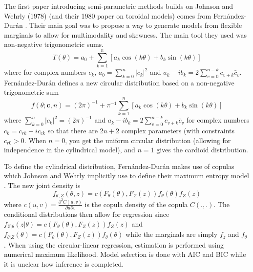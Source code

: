 The first paper introducing semi-parametric methods builds on Johnson and Wehrly (1978) (and their 1980 paper on toroidal models) comes from Fern\'{a}ndez-Dur\'{a}n \cite{fernandez-duran_models_2007}. Their main goal was to propose a way to generate models from flexible marginals to allow for multimodality and skewness. The main tool they used was non-negative trigonometric sums. \[T(\theta) = a_0 + \sum_{k=1}^n \left[a_k \cos(k\theta) + b_k \sin(k\theta)\right]\] where for complex numbers $c_k$, $a_0 = \sum_{k=0}^n|c_k|^2$ and $a_k - i b_k = 2\sum_{v=0}^{n-k}c_{v+k} \bar{c}_v$. Fern\'{a}ndez-Dur\'{a}n defines a new circular distribution based on a non-negative trigonometric sum \[f(\theta; \mathbf{c}, n) = (2\pi)^{-1} + \pi^{-1} \sum_{k=1}^n \left[a_k \cos(k\theta) + b_k \sin(k\theta)\right]\] where $\sum_{k=0}^n|c_k|^2 = (2\pi)^{-1}$ and $a_k - i b_k = 2\sum_{v=0}^{n-k}c_{v+k} \bar{c}_v$ for complex numbers $c_k = c_{rk} + i c_{ck}$ so that there are $2n+2$ complex parameters (with constraints $c_{r0} > 0$. When $n=0$, you get the uniform circular distribution (allowing for independence in the cylindrical model), and $n=1$ gives the cardioid distribution. 

To define the cylindrical distribution, Fern\'{a}ndez-Dur\'{a}n makes use of copulas which Johnson and Wehrly implicitly use to define their maximum entropy model \cite{fernandez-duran_models_2007}\cite{johnson_angular-linear_1978}. The new joint density is \[f_{\theta, Z}(\theta, z) = c(F_\theta(\theta), F_Z(z))f_\theta(\theta)f_Z(z)\] where $c(u,v) = \frac{\partial^2 C(u,v)}{\partial u \partial v}$ is the copula density of the copula $C(.,.)$. The conditional distributions then allow for regression since $f_{Z|\theta}(z|\theta) = c(F_\theta(\theta), F_Z(z))f_Z(z)$ and $f_{\theta|Z}(\theta) = c(F_\theta(\theta), F_Z(z))f_\theta(\theta)$ while the marginals are simply $f_z$ and $f_\theta$ \cite{fernandez-duran_models_2007}. When using the circular-linear regression, estimation is performed using numerical maximum likelihood. Model selection is done with AIC and BIC while it is unclear how inference is completed. 


